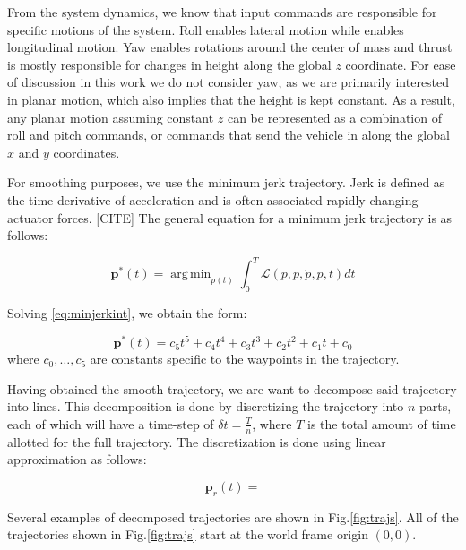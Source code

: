 \documentclass[letterpaper, 10 pt, conference]{ieeeconf}  %
\DeclareMathOperator*{\argmin}{arg\,min}
\begin{document}
From the system dynamics, we know that input commands are responsible for specific motions of the system. Roll enables lateral motion while enables longitudinal motion. Yaw enables rotations around the center of mass and thrust is mostly responsible for changes in height along the global $z$ coordinate. For ease of discussion in this work we do not consider yaw, as we are primarily interested in planar motion, which also implies that the height is kept constant. As a result, any planar motion assuming constant $z$ can be represented as a combination of roll and pitch commands, or commands that send the vehicle in along the global $x$ and $y$ coordinates.

For smoothing purposes, we use the minimum jerk trajectory. Jerk is defined as the time derivative of acceleration and is often associated rapidly changing actuator forces. [CITE] The general equation for a minimum jerk trajectory is as follows:

\begin{equation} \label{eq:minjerkint}
    \mathbf{p}^*(t) = \argmin_{p(t)}\int_0^T\mathcal{L}(\dddot{p},\ddot{p},\dot{p},p,t)dt
\end{equation}

Solving \eqref{eq:minjerkint}, we obtain the form:

\begin{equation}
    \mathbf{p}^*(t) = c_5t^5 + c_4t^4 + c_3t^3 + c_2t^2 + c_1t + c_0 
\end{equation}
where $c_0,\ldots,c_5$ are constants specific to the waypoints in the trajectory.

Having obtained the smooth trajectory, we are want to decompose said trajectory into lines. This decomposition is done by discretizing the trajectory into $n$ parts, each of which will have a time-step of $\delta t = \frac{T}{n}$, where $T$ is the total amount of time allotted for the full trajectory. The discretization is done using linear approximation as follows:

\begin{equation}
    \mathbf{p}_r(t) = 
\end{equation}

Several examples of decomposed trajectories are shown in Fig.\ref{fig:trajs}. All of the trajectories shown in Fig.\ref{fig:trajs} start at the world frame origin $(0,0)$.
\end{document}
